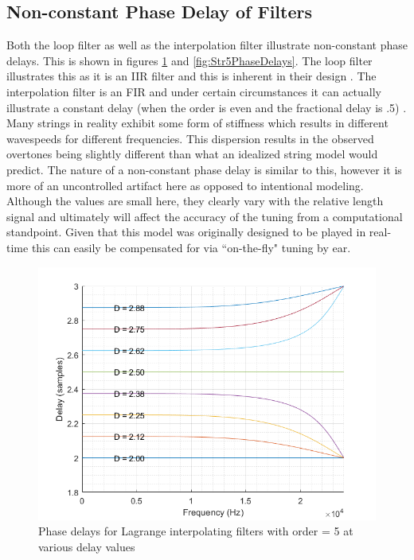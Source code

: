 \documentclass[../main.tex]{subfiles}
\begin{document}
\subsection{Non-constant Phase Delay of Filters}
Both the loop filter as well as the interpolation filter illustrate non-constant phase delays. This is shown in figures \ref{fig:LagrangePhaseDelays} and \ref{fig:Str5PhaseDelays}. The loop filter illustrates this as it is an IIR filter and this is inherent in their design . The interpolation filter is an FIR and under certain circumstances it can actually illustrate a constant delay (when the order is even and the fractional delay is .5) . Many strings in reality exhibit some form of stiffness which results in different wavespeeds for different frequencies. This dispersion results in the observed overtones being slightly different than what an idealized string model would predict. The nature of a non-constant phase delay is similar to this, however it is more of an uncontrolled artifact here as opposed to intentional modeling. Although the values are small here, they clearly vary with the relative length signal and ultimately will affect the accuracy of the tuning from a computational standpoint. Given that this model was originally designed to be played in real-time this can easily be compensated for via ``on-the-fly" tuning by ear.

\begin{figure}[h]
    \centering
    \includegraphics[scale=.65]{./images/plots/Lagrange Phase Delays.png}
    \caption{Phase delays for Lagrange interpolating filters with order = 5 at various delay values}
    \label{fig:LagrangePhaseDelays}
\end{figure}
\end{document}
